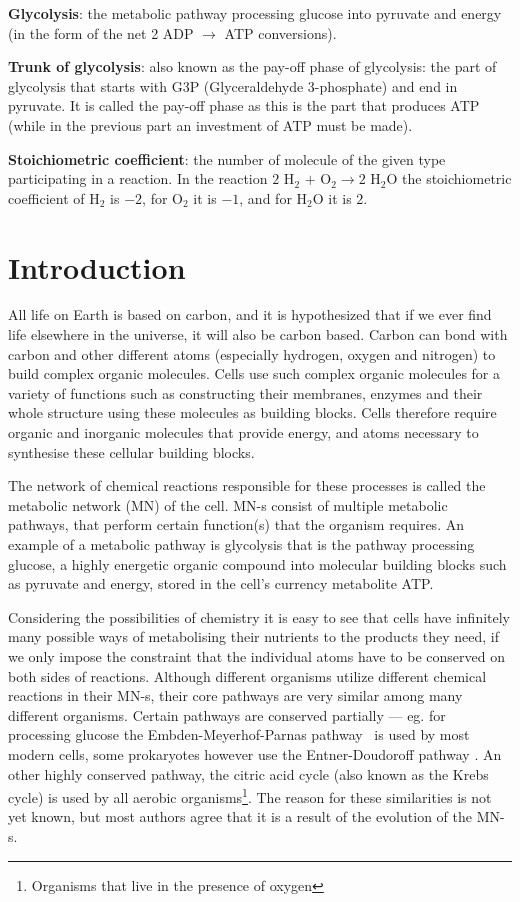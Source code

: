 \documentclass[a4paper,12pt]{article}
\begin{document}
\begin{framed}
	\textbf{Glycolysis}: the metabolic pathway processing glucose into pyruvate and energy (in the form of the net 2 ADP $\rightarrow$ ATP conversions).

	\textbf{Trunk of glycolysis}: also known as the pay-off phase of glycolysis: the part of glycolysis that starts with G3P (Glyceraldehyde 3-phosphate) and end in pyruvate. It is called the pay-off phase as this is the part that produces ATP (while in the previous part an investment of ATP must be made).
	
	\textbf{Stoichiometric coefficient}: the number of molecule of the given type participating in a reaction. In the reaction $2$ H$_2$ $+$ O$_2 \rightarrow 2$ H$_2$O the stoichiometric coefficient of H$_2$ is $-2$, for O$_2$ it is $-1$, and for H$_2$O it is $2$. 

	\end{framed}

	\newpage
	\section{Introduction}

	All life on Earth is based on carbon, and it is hypothesized that if we ever find life elsewhere in the universe, it will also be carbon based. %
	Carbon can bond with carbon and other different atoms (especially hydrogen, oxygen and nitrogen) to build complex organic molecules. Cells use such complex organic molecules for a variety of functions such as constructing their membranes, enzymes and their whole structure using these molecules as building blocks. Cells therefore require organic and inorganic molecules that provide energy, and atoms necessary to synthesise these cellular building blocks.

	The network of chemical reactions responsible for these processes is called the metabolic network (MN) of the cell. MN-s consist of multiple metabolic pathways, that perform certain function(s) that the organism requires. An example of a metabolic pathway is glycolysis that is the pathway processing glucose, a highly energetic organic compound into molecular building blocks such as pyruvate and energy, stored in the cell's currency metabolite ATP.
	
	Considering the possibilities of chemistry it is easy to see that cells have infinitely many possible ways of metabolising their nutrients to the products they need, if we only impose the constraint that the individual atoms have to be conserved on both sides of reactions. Although different organisms utilize different chemical reactions in their MN-s, their core pathways are very similar among many different organisms. Certain pathways are conserved partially --- eg. for processing glucose the Embden-Meyerhof-Parnas pathway \cite{EMPpathway}~is used by most modern cells, some prokaryotes however use the Entner-Doudoroff pathway \cite{EDpathway}. An other highly conserved pathway, the citric acid cycle (also known as the Krebs cycle) is used by all aerobic organisms\footnote{Organisms that live in the presence of oxygen}.
	The reason for these similarities is not yet known, but most authors agree that it is a result of the evolution of the MN-s. 
\end{document}
